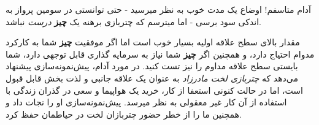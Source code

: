 آدام متاسفم! اوضاع یک مدت خوب به نظر میرسید - حتی توانستی در سومین پرواز
به اندکی سود برسی - اما میترسم که چتربازی برهنه یک \textbf{چیز}
\emph{درست} نباشد.

مقدار بالای سطح علاقه اولیه بسیار خوب است اما اگر موفقیت \textbf{چیز}
شما به کارکرد مدوام احتیاج دارد، و همچنین اگر \textbf{چیز} شما نیاز به
سرمایه گذاری قابل توجهی دارد، شما بایستی سطح علاقه مداوم را نیز تست
کنید. در مورد آدام، پیش‌نمونه‌سازی پیشنهاد می‌دهد که \emph{چتربازی لخت
مادرزاد} به عنوان یک علاقه جانبی و لذت بخش قابل قبول است، اما در حالت
کنونی استعفا از کار، خرید یک هواپیما و سعی در گذران زندگی با استفاده از
آن کار غیر معقولی به نظر میرسد. پیش‌نمونه‌سازی او را نجات داد و همچنین
ما را از خطر حضور چتربازان لخت در حیاطمان حفظ کرد.
